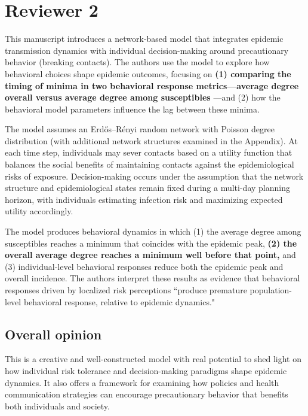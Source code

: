 \documentclass{article}
\newcommand{\blue}[1]{{\textcolor{blue}{#1}}}
\begin{document}

\vspace{0.5cm}

\section*{Reviewer 2}
This manuscript introduces a network-based model that integrates epidemic transmission dynamics with individual decision-making around precautionary behavior (breaking contacts).  
The authors use the model to explore how behavioral choices shape epidemic outcomes, focusing on 
{\bf
(1) comparing the timing of minima in two behavioral response metrics—average degree overall versus average degree among susceptibles
}
—and (2) how the behavioral model parameters influence the lag between these minima.

The model assumes an Erdős–Rényi random network with Poisson degree distribution (with additional network structures examined in the Appendix). At each time step, individuals may sever contacts based on a utility function that balances the social benefits of maintaining contacts against the epidemiological risks of exposure. Decision-making occurs under the assumption that the network structure and epidemiological states remain fixed during a
multi-day planning horizon, with individuals estimating infection risk and maximizing expected utility accordingly.

The model produces behavioral dynamics in which (1) the average degree among susceptibles reaches a minimum that coincides with the epidemic peak, 
{\bf 
(2) the overall average degree reaches a minimum well before that point,
}
and (3) individual-level behavioral responses reduce both the epidemic peak and overall incidence. The authors interpret these results as evidence that behavioral responses driven by localized risk perceptions ``produce premature population-level behavioral response, relative to epidemic dynamics."

\subsection*{Overall opinion}
This is a creative and well-constructed model with real potential to shed light on how individual risk tolerance and decision-making paradigms shape epidemic dynamics. It also offers a framework for examining how policies and health communication strategies can encourage precautionary behavior that benefits both individuals and society. 
\end{document}
